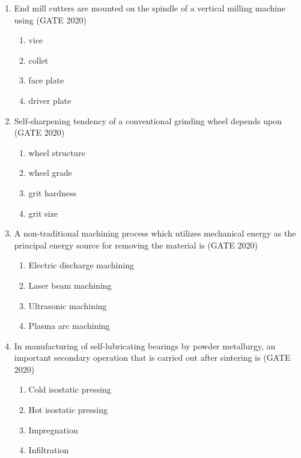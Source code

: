 \documentclass[journal,12pt,onecolumn]{IEEEtran}
\theoremstyle{remark}
\begin{document}
\begin{enumerate}
\item End mill cutters are mounted on the spindle of a vertical milling machine using
\hfill{(GATE 2020)}
\begin{multicols}{4}
\begin{enumerate}
    \item vice
    \item collet
    \item face plate
    \item driver plate
\end{enumerate}
\end{multicols}
\vspace{1cm}

\item Self-sharpening tendency of a conventional grinding wheel depends upon
\hfill{(GATE 2020)}
\begin{multicols}{4}
\begin{enumerate}
    \item wheel structure
    \item wheel grade
    \item grit hardness
    \item grit size
\end{enumerate}
\end{multicols}
\vspace{1cm}

\item A non-traditional machining process which utilizes mechanical energy as the principal energy source for removing the material is
\hfill{(GATE 2020)}

\begin{enumerate}
    \item Electric discharge machining
    \item Laser beam machining
    \item Ultrasonic machining
    \item Plasma arc machining
\end{enumerate}

\vspace{1cm}

\item In manufacturing of self-lubricating bearings by powder metallurgy, an important secondary operation that is carried out after sintering is
\hfill{(GATE 2020)}

\begin{enumerate}
    \item Cold isostatic pressing
    \item Hot isostatic pressing
    \item Impregnation
    \item Infiltration
\end{enumerate}


\end{enumerate}
\end{document}
